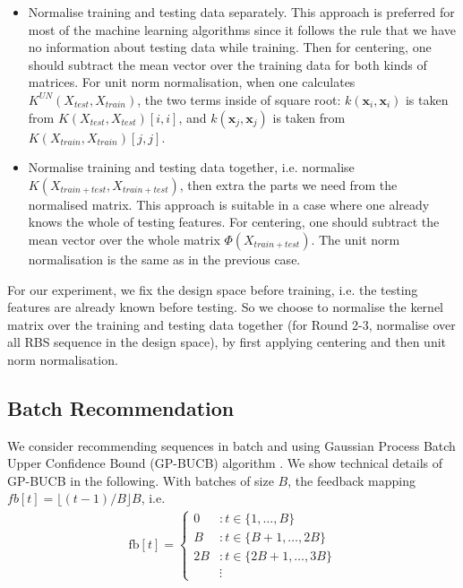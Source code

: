 \documentclass{scrartcl}[2013/05/29]%
\begin{document}
\begin{itemize}
    \item Normalise training and testing data separately.
    This approach is preferred for most of the machine learning algorithms since it follows the rule that we have no information about testing data while training.
    Then for centering, one should subtract the mean vector over the training data for both kinds of matrices.
    For unit norm normalisation, when one calculates $K^{UN}(X_{test}, X_{train})$, the two terms inside of square root: $k(\mathbf{x}_i, \mathbf{x}_i)$ is taken from $K(X_{test}, X_{test})[i,i]$, and $k(\mathbf{x}_j, \mathbf{x}_j)$ is taken from $K(X_{train}, X_{train})[j,j]$.
    
    \item Normalise training and testing data together, i.e. normalise $K(X_{train+test}, X_{train+test})$, then extra the parts we need from the normalised matrix. 
    This approach is suitable in a case where one already knows the whole of testing features. 
    For centering, one should subtract the mean vector over the whole matrix $\Phi(X_{train+test})$. 
    The unit norm normalisation is the same as in the previous case. 
\end{itemize}

For our experiment, we fix the design space before training, i.e. the testing features are already known before testing. 
So we choose to normalise the kernel matrix over the training and testing data together (for Round 2-3, normalise over all RBS sequence in the design space),
by first applying centering and then unit norm normalisation. 

\subsection{Batch Recommendation}

We consider recommending sequences in batch and using Gaussian Process Batch Upper Confidence Bound (GP-BUCB) algorithm  \cite{desautels2014parallelizing}.
We show technical details of GP-BUCB in the following.
With batches of size $B$, the feedback mapping $fb[t] = \lfloor(t-1) / B\rfloor B$, i.e. 
\begin{align}
    \mathrm{fb}[t]=\left\{\begin{array}{cl}
    0 & : t \in\{1, \ldots, B\} \\
    B & : t \in\{B+1, \ldots, 2 B\} \\
    2 B & : t \in\{2 B+1, \ldots, 3 B\} \\
    & \vdots
    \end{array}\right.
\end{align}
\end{document}
